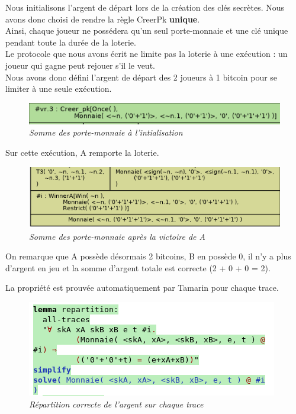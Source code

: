 \documentclass[conference]{IEEEtran}
\begin{document}
Nous initialisons l'argent de départ lors de la création des clés secrètes. Nous avons donc choisi de rendre la règle CreerPk \textbf{unique}. \\Ainsi, chaque joueur ne possédera qu'un seul porte-monnaie et une clé unique pendant toute la durée de la loterie.\\

Le protocole que nous avons écrit ne limite pas la loterie à une exécution : un joueur qui gagne peut rejouer s'il le veut. \\
Nous avons donc défini l'argent de départ des 2 joueurs à 1 bitcoin pour se limiter à une seule exécution.
    
    \begin{figure}[!h]
    \centering
    \includegraphics[scale=0.62]{Init.png}
    \caption{\textit{Somme des porte-monnaie à l'intialisation}}
    \label{fig:my_label}
\end{figure}

Sur cette exécution, A remporte la loterie.

\begin{figure}[!h]
    \centering
    \includegraphics[scale=0.55]{fin.png}
    \caption{\textit{Somme des porte-monnaie après la victoire de A}}
    \label{fig:my_label}
\end{figure}

On remarque que A possède désormais 2 bitcoins, B en possède 0, il n'y a plus d'argent en jeu et la somme d'argent totale est correcte (2 + 0 + 0 = 2). 

La propriété est prouvée automatiquement par Tamarin pour chaque trace. 

\begin{figure}[!h]
    \centering
    \includegraphics[scale=0.65]{repartition.png}
    \caption{\textit{Répartition correcte de l'argent sur chaque trace}}
    \label{fig:my_label}
\end{figure}
\end{document}
